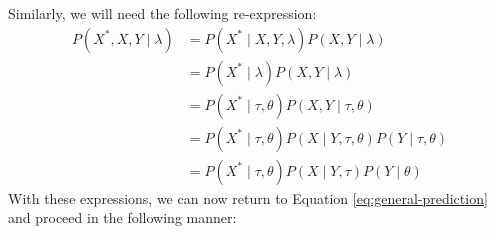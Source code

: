 \documentclass{article}
\begin{document}
Similarly, we will need the following re-expression:
\begin{equation}
\label{eq:auxillary-generative}
\begin{aligned}
P \left( X^{*}, X, Y \mid \lambda \right) &= P \left( X^{*} \mid X, Y, \lambda \right) P \left( X, Y \mid \lambda \right)\\
&= P \left( X^{*} \mid \lambda \right) P \left( X, Y \mid \lambda \right)\\
&= P \left( X^{*} \mid \tau, \theta \right) P \left( X, Y \mid \tau, \theta \right)\\
&= P \left( X^{*} \mid \tau, \theta \right) P \left( X \mid Y, \tau, \theta \right) P \left( Y \mid \tau, \theta \right)\\
&= P \left( X^{*} \mid \tau, \theta \right) P \left( X \mid Y, \tau \right) P \left( Y \mid \theta \right)
\end{aligned}
\end{equation}
With these expressions, we can now return to Equation \ref{eq:general-prediction} and proceed in the following manner:
\end{document}
